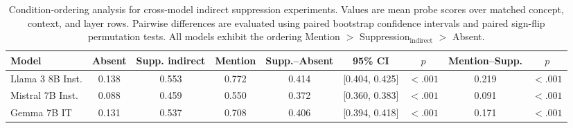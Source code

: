 \begin{table}[t]
\centering
\small
\begin{tabular}{lcccccccc}
\toprule
Model & Absent & Supp. indirect & Mention & Supp.--Absent & 95\% CI & $p$ & Mention--Supp. & $p$ \\
\midrule
Llama 3 8B Inst. & 0.138 & 0.553 & 0.772 & 0.414 & [0.404, 0.425] & $<.001$ & 0.219 & $<.001$ \\
Mistral 7B Inst. & 0.088 & 0.459 & 0.550 & 0.372 & [0.360, 0.383] & $<.001$ & 0.091 & $<.001$ \\
Gemma 7B IT & 0.131 & 0.537 & 0.708 & 0.406 & [0.394, 0.418] & $<.001$ & 0.171 & $<.001$ \\
\bottomrule
\end{tabular}
\caption{
Condition-ordering analysis for cross-model indirect suppression experiments. Values are mean probe scores over matched concept, context, and layer rows. Pairwise differences are evaluated using paired bootstrap confidence intervals and paired sign-flip permutation tests. All models exhibit the ordering Mention $>$ Suppression$_{\mathrm{indirect}}$ $>$ Absent.
}
\label{tab:condition-ordering}
\end{table}
